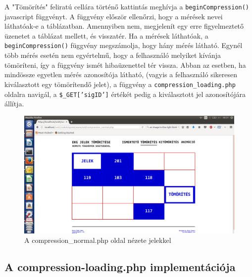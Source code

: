 \documentclass[oneside,titlepage,12pt,a4paper]{report}
\begin{document}
\par A "Tömörítés" feliratú cellára történő kattintás meghívja a \texttt{beginCompression()} javascript függvényt. A függvény először ellenőrzi, hogy a mérések nevei láthatóak-e a táblázatban. Amennyiben nem, megjelenít egy erre figyelmeztető üzenetet a táblázat mellett, és visszatér. Ha a mérések láthatóak, a \texttt{beginCompression()} függvény megszámolja, hogy hány mérés látható. Egynél több mérés esetén nem egyértelmű, hogy a felhasználó melyiket kívánja tömöríteni, így a függvény ismét hibaüzenettel tér vissza. Abban az esetben, ha mindössze egyetlen mérés azonosítója látható, (vagyis a felhasználó sikeresen kiválasztott egy tömörítendő jelet), a függvény a \texttt{compression\_loading.php} oldalra navigál, a \texttt{\$\_GET['sigID']} értékét pedig a kiválasztott jel azonosítójára állítja.   

\begin{figure}[H]
\begin{center}
  \includegraphics[width=150mm]{./Abrak/WWW/tomor_jelek.png}
  \caption{A compression\_normal.php oldal nézete jelekkel}
\end{center}
\end{figure}

\subsection{A compression-loading.php implementációja}
\end{document}
